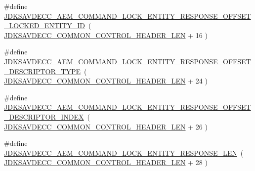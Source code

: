 \begin{DoxyCompactItemize}
\#define \hyperlink{group__command__lock__entity__response_ga999df0c80eb000016d847407246ac1ae}{J\+D\+K\+S\+A\+V\+D\+E\+C\+C\+\_\+\+A\+E\+M\+\_\+\+C\+O\+M\+M\+A\+N\+D\+\_\+\+L\+O\+C\+K\+\_\+\+E\+N\+T\+I\+T\+Y\+\_\+\+R\+E\+S\+P\+O\+N\+S\+E\+\_\+\+O\+F\+F\+S\+E\+T\+\_\+\+L\+O\+C\+K\+E\+D\+\_\+\+E\+N\+T\+I\+T\+Y\+\_\+\+ID}~( \hyperlink{group__jdksavdecc__avtp__common__control__header_gaae84052886fb1bb42f3bc5f85b741dff}{J\+D\+K\+S\+A\+V\+D\+E\+C\+C\+\_\+\+C\+O\+M\+M\+O\+N\+\_\+\+C\+O\+N\+T\+R\+O\+L\+\_\+\+H\+E\+A\+D\+E\+R\+\_\+\+L\+EN} + 16 )
\item 
\#define \hyperlink{group__command__lock__entity__response_gab94c69e9488369de6da996d585a2f85d}{J\+D\+K\+S\+A\+V\+D\+E\+C\+C\+\_\+\+A\+E\+M\+\_\+\+C\+O\+M\+M\+A\+N\+D\+\_\+\+L\+O\+C\+K\+\_\+\+E\+N\+T\+I\+T\+Y\+\_\+\+R\+E\+S\+P\+O\+N\+S\+E\+\_\+\+O\+F\+F\+S\+E\+T\+\_\+\+D\+E\+S\+C\+R\+I\+P\+T\+O\+R\+\_\+\+T\+Y\+PE}~( \hyperlink{group__jdksavdecc__avtp__common__control__header_gaae84052886fb1bb42f3bc5f85b741dff}{J\+D\+K\+S\+A\+V\+D\+E\+C\+C\+\_\+\+C\+O\+M\+M\+O\+N\+\_\+\+C\+O\+N\+T\+R\+O\+L\+\_\+\+H\+E\+A\+D\+E\+R\+\_\+\+L\+EN} + 24 )
\item 
\#define \hyperlink{group__command__lock__entity__response_gaa1d94f314baf768ca85e3e08ac808f8f}{J\+D\+K\+S\+A\+V\+D\+E\+C\+C\+\_\+\+A\+E\+M\+\_\+\+C\+O\+M\+M\+A\+N\+D\+\_\+\+L\+O\+C\+K\+\_\+\+E\+N\+T\+I\+T\+Y\+\_\+\+R\+E\+S\+P\+O\+N\+S\+E\+\_\+\+O\+F\+F\+S\+E\+T\+\_\+\+D\+E\+S\+C\+R\+I\+P\+T\+O\+R\+\_\+\+I\+N\+D\+EX}~( \hyperlink{group__jdksavdecc__avtp__common__control__header_gaae84052886fb1bb42f3bc5f85b741dff}{J\+D\+K\+S\+A\+V\+D\+E\+C\+C\+\_\+\+C\+O\+M\+M\+O\+N\+\_\+\+C\+O\+N\+T\+R\+O\+L\+\_\+\+H\+E\+A\+D\+E\+R\+\_\+\+L\+EN} + 26 )
\item 
\#define \hyperlink{group__command__lock__entity__response_ga888dbb2c51eee94d2275b4041ac26aed}{J\+D\+K\+S\+A\+V\+D\+E\+C\+C\+\_\+\+A\+E\+M\+\_\+\+C\+O\+M\+M\+A\+N\+D\+\_\+\+L\+O\+C\+K\+\_\+\+E\+N\+T\+I\+T\+Y\+\_\+\+R\+E\+S\+P\+O\+N\+S\+E\+\_\+\+L\+EN}~( \hyperlink{group__jdksavdecc__avtp__common__control__header_gaae84052886fb1bb42f3bc5f85b741dff}{J\+D\+K\+S\+A\+V\+D\+E\+C\+C\+\_\+\+C\+O\+M\+M\+O\+N\+\_\+\+C\+O\+N\+T\+R\+O\+L\+\_\+\+H\+E\+A\+D\+E\+R\+\_\+\+L\+EN} + 28 )
\end{DoxyCompactItemize}
